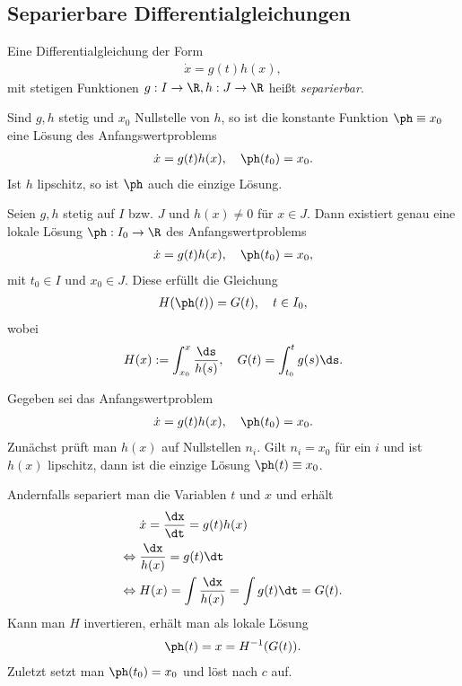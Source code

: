\subsection{Separierbare Differentialgleichungen}

\begin{defn}
Eine Differentialgleichung der Form
\begin{align*}
\dot{x} = g(t)h(x),
\end{align*}
mit stetigen Funktionen $g: I\to\R, h: J\to \R$ heißt \emph{separierbar}.
\end{defn}

\begin{prop}
Sind $g,h$ stetig und $x_0$ Nullstelle von $h$, so ist die konstante Funktion
$\ph\equiv x_0$ eine Lösung des Anfangswertproblems
\begin{align*}
\dot{x} = g(t)h(x),\quad \ph(t_0) = x_0.
\end{align*}
Ist $h$ lipschitz, so ist $\ph$ auch die einzige Lösung.
\end{prop}
\begin{prop}
Seien $g,h$ stetig auf $I$ bzw. $J$ und $h(x)\neq 0$ für $x\in J$. Dann
existiert genau eine lokale Lösung $\ph: I_0\to\R$ des Anfangswertproblems
\begin{align*}
\dot{x} = g(t)h(x),\quad \ph(t_0) = x_0,
\end{align*}
mit $t_0\in I$ und $x_0\in J$. Diese erfüllt die Gleichung
\begin{align*}
H(\ph(t)) = G(t),\quad t\in I_0,
\end{align*}
wobei
\begin{align*}
H(x) := \int_{x_0}^x \frac{\ds}{h(s)},\quad G(t) = \int_{t_0}^t
g(s)\ds.
\end{align*}
\end{prop}
\begin{prop}[Prozedur]
Gegeben sei das Anfangswertproblem
\begin{align*}
\dot{x} = g(t)h(x),\quad \ph(t_0) = x_0.
\end{align*}
Zunächst prüft man $h(x)$ auf Nullstellen $n_i$. Gilt $n_i = x_0$ für ein $i$
und ist $h(x)$ lipschitz, dann ist die einzige Lösung $\ph(t) \equiv x_0$.

Andernfalls separiert man die Variablen $t$ und $x$ und erhält
\begin{align*}
& \dot{x} = \frac{\dx}{\dt} = g(t)h(x)\\
\Leftrightarrow\;&\frac{\dx}{h(x)} = g(t)\dt\\
\Leftrightarrow\;&H(x) = \int \frac{\dx}{h(x)} = \int g(t)\dt = G(t).
\end{align*}
Kann man $H$ invertieren, erhält man als lokale Lösung
\begin{align*}
\ph(t) = x = H^{-1}(G(t)).
\end{align*}
Zuletzt setzt man $\ph(t_0) = x_0$ und löst nach $c$ auf. 
\end{prop}

